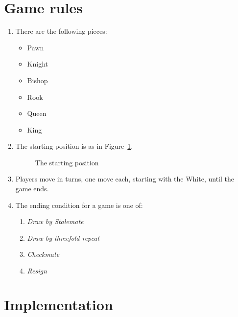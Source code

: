 \theoremstyle{remark}
\newtheorem{rem}{Remark}

\section{Game rules}

\begin{enumerate}
\item There are the following pieces:
  \begin{itemize}
  \item Pawn \pawn
  \item Knight \knight
  \item Bishop \bishop
  \item Rook \rook
  \item Queen \queen
  \item King \king
  \end{itemize}
\item The starting position is as in Figure~\ref{fig:reset}.
  \begin{figure}[!ht]
    \centering
    \newgame\showboard
    \caption{The starting position}
    \label{fig:reset}
  \end{figure}
\item Players move in turns, one move each, starting with the White,
  until the game ends.
\item The ending condition for a game is one of:
  \begin{enumerate}
  \item \emph{Draw by Stalemate}
  \item \emph{Draw by threefold repeat} 
  \item \emph{Checkmate}
  \item \emph{Resign}
  \end{enumerate}
\end{enumerate}

\section{Implementation}

